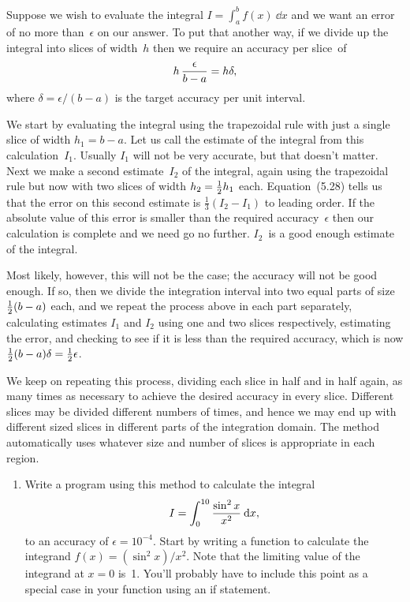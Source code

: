 \documentclass[12pt]{article}
\begin{document}
\begin{exercises}
  Suppose we wish to evaluate the integral $I = \int_a^b f(x) \>\dd x$ and
  we want an error of no more than~$\epsilon$ on our answer.  To put that
  another way, if we divide up the integral into slices of width~$h$ then
  we require an accuracy per slice~of
\begin{displaymath}
h\,{\epsilon\over b-a} = h\delta,
\end{displaymath}
where $\delta = \epsilon/(b-a)$ is the target accuracy per unit interval.

We start by evaluating the integral using the trapezoidal rule with just a
single slice of width $h_1=b-a$.  Let us call the estimate of the integral
from this calculation~$I_1$.  Usually $I_1$ will not be very accurate, but
that doesn't matter.  Next we make a second estimate~$I_2$ of the integral,
again using the trapezoidal rule but now with two slices of width
$h_2=\tfrac12 h_1$ each.  Equation~(5.28) tells us that the error on this
second estimate is $\frac13(I_2-I_1)$ to leading order.  If the absolute
value of this error is smaller than the required accuracy~$\epsilon$ then
our calculation is complete and we need go no further.  $I_2$~is a good
enough estimate of the integral.

Most likely, however, this will not be the case; the accuracy will not be
good enough.  If so, then we divide the integration interval into two equal
parts of size $\tfrac12 (b-a)$ each, and we repeat the process above in each
part separately, calculating estimates $I_1$ and $I_2$ using one and two
slices respectively, estimating the error, and checking to see if it is
less than the required accuracy, which is now $\tfrac12(b-a)\delta =
\tfrac12\epsilon$.

We keep on repeating this process, dividing each slice in half and in half
again, as many times as necessary to achieve the desired accuracy in every
slice.  Different slices may be divided different numbers of times, and
hence we may end up with different sized slices in different parts of the
integration domain.  The method automatically uses whatever size and number
of slices is appropriate in each region.
\begin{enumerate}\setlength{\itemsep}{0pt}
\item Write a program using this method to calculate the integral
\begin{displaymath}
I = \int_0^{10} {\sin^2 x\over x^2} \>\mathrm{d} x,
\end{displaymath}
to an accuracy of $\epsilon=10^{-4}$.  Start by writing a function to
calculate the integrand $f(x) = (\sin^2 x)/x^2$.  Note that the limiting
value of the integrand at $x=0$ is~1.  You'll probably have to include this
point as a special case in your function using an if statement.


\end{enumerate}
\end{exercises}
\end{document}
